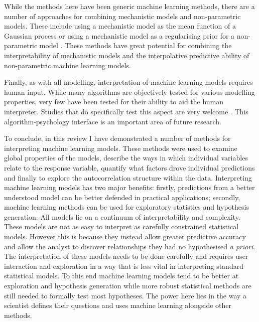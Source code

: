 \documentclass[12pt,]{article}
\begin{document}
While the methods here have been generic machine learning methods, there are a number of approaches for combining mechanistic models and non-parametric models.
These include using a mechanistic model as the mean function of a Gaussian process \citep{rasmussen2004gaussian} or using a mechanistic model as a regularising prior for a non-parametric model \citep{lyddon2018nonparametric}.
These methods have great potential for combining the interpretability of mechanistic models and the interpolative predictive ability of non-parametric machine learning models.

Finally, as with all modelling, interpretation of machine learning models requires human input.
While many algorithms are objectively tested for various modelling properties, very few have been tested for their ability to aid the human interpreter.
Studies that do specifically test this aspect are very welcome \citep{bastani2017interpreting}.
This algorithm-psychology interface is an important area of future research.

To conclude, in this review I have demonstrated  a number of methods for interpreting machine learning models.
These methods were used to examine global properties of the models, describe the ways in which individual variables relate to the response variable, quantify what factors drove individual predictions and finally to explore the autocorrelation structure within the data.
Interpreting machine learning models has two major benefits: firstly, predictions from a better understood model can be better defended in practical applications; secondly, machine learning methods can be used for exploratory statistics and hypothesis generation.
All models lie on a continuum of interpretability and complexity.
These models are not as easy to interpret as carefully constrained statistical models.
However this is because they instead allow greater predictive accuracy and allow the analyst to discover relationships they had no hypothesised \emph{a priori}.
The interpretation of these models needs to be done carefully and requires user interaction and exploration in a way that is less vital in interpreting standard statistical models.
To this end machine learning models tend to be better at exploration and hypothesis generation while more robust statistical methods are still needed to formally test most hypotheses.
The power here lies in the way a scientist defines their questions and uses machine learning alongside other methods.

 



\end{document}
